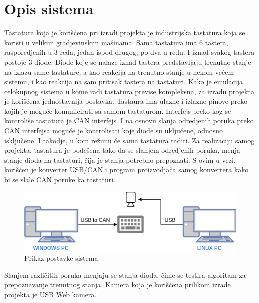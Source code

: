\documentclass[a4paper,12pt, projekat]{etf}
\begin{document}
        \chapter{Opis sistema}
        Tastatura koja je kori\v{s}\'{c}ena pri izradi projekta je industrijska tastatura
        koja se koristi u velikim gradjevinskim ma\v{s}inama. Sama tastatura ima 6
        tastera, rasporedjenih u 3 reda, jedan ispod drugog, po dva u redu. I
        iznad svakog tastera postoje 3 diode. Diode koje se nalaze iznad
        tastera predstavljaju trenutno stanje na izlazu same tastature, a kao
        reakcija na trenutno stanje u nekom ve\'{c}em sistemu, i kao reakcija na
        sam pritisak tastera na tastaturi. Kako je emulacija celokupnog sistema
        u kome radi tastatura previse kompleksna, za izradu projekta je
        kori\v{s}\'{c}ena jednostavnija postavka. Tastaura ima ulazne i izlazne pinove
        preko kojih je mogu\'{c}e komunicirati sa samom tastaturom. Interfejs preko
        kog se kontroli\v{s}e tastatura je CAN interfejs. I na osnovu slanja
        odredjenih poruka preko CAN interfejsa mogu\'{c}e je kontrolisati koje
        diode su uklju\v{c}ene, odnosno isklju\v{c}ene. I takodje, u kom
        re\v{z}imu \'{c}e sama tastatura raditi. Za realizaciju samog projekta,
        tastatura je pode\v{s}ena tako da se slanjem odredjenih poruka, menja stanje
        dioda na tastaturi, \v{c}ija je stanja potrebno prepoznati. S ovim u
        vezi, kori\v{s}\'{c}en je konverter USB/CAN i program proizvodja\v{c}a samog
        konvertera kako bi se slale CAN poruke ka tastaturi.

        \begin{figure}[htb]
            \centering
            \includegraphics[scale=0.5]{keyboardSetup.png}
            \caption{Prikaz postavke sistema}
            \label{fig:keyboardsetup}
        \end{figure}

        Slanjem razli\v{c}itih poruka menjaju se stanja dioda, \v{c}ime se testira
        algoritam za prepoznavanje trenutnog stanja. Kamera koja je
        kori\v{s}\'{c}ena prilikom izrade projekta je USB Web kamera.
\end{document}
